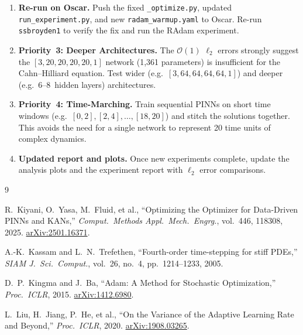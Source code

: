 \documentclass[11pt,a4paper]{article}
\begin{document}
\begin{enumerate}
  \item \textbf{Re-run on Oscar.}  Push the fixed
        \texttt{\_optimize.py}, updated \texttt{run\_experiment.py},
        and new \texttt{radam\_warmup.yaml} to Oscar.  Re-run
        \texttt{ssbroyden1} to verify the fix and run the RAdam
        experiment.

  \item \textbf{Priority~3: Deeper Architectures.}  The
        $\mathcal{O}(1)$ $\ell_2$ errors strongly suggest the
        $[3,20,20,20,20,1]$ network (1{,}361 parameters) is
        insufficient for the Cahn--Hilliard equation.  Test wider
        (e.g.\ $[3,64,64,64,64,1]$) and deeper (e.g.\ 6--8~hidden
        layers) architectures.

  \item \textbf{Priority~4: Time-Marching.}  Train sequential PINNs
        on short time windows (e.g.\ $[0,2], [2,4], \ldots, [18,20]$)
        and stitch the solutions together.  This avoids the need for a
        single network to represent 20 time units of complex dynamics.

  \item \textbf{Updated report and plots.}  Once new experiments
        complete, update the analysis plots and the experiment report
        with $\ell_2$ error comparisons.
\end{enumerate}



\begin{thebibliography}{9}

  R.~Kiyani, O.~Yasa, M.~Fluid, et al.,
  ``Optimizing the Optimizer for Data-Driven PINNs and KANs,''
  \emph{Comput.\ Methods Appl.\ Mech.\ Engrg.}, vol.~446, 118308, 2025.
  \href{https://arxiv.org/abs/2501.16371}{arXiv:2501.16371}.

  A.-K.~Kassam and L.~N.~Trefethen,
  ``Fourth-order time-stepping for stiff PDEs,''
  \emph{SIAM J.\ Sci.\ Comput.}, vol.~26, no.~4, pp.~1214--1233, 2005.

  D.~P.~Kingma and J.~Ba,
  ``Adam: A Method for Stochastic Optimization,''
  \emph{Proc.\ ICLR}, 2015.
  \href{https://arxiv.org/abs/1412.6980}{arXiv:1412.6980}.

  L.~Liu, H.~Jiang, P.~He, et al.,
  ``On the Variance of the Adaptive Learning Rate and Beyond,''
  \emph{Proc.\ ICLR}, 2020.
  \href{https://arxiv.org/abs/1908.03265}{arXiv:1908.03265}.

\end{thebibliography}
\end{document}
